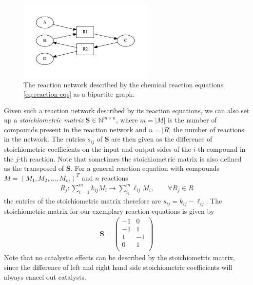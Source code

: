 \documentclass[10pt]{article}
\newcommand{\mb}[1]{\mathbf{#1}}
\begin{document}
\begin{figure}%
    \centering
    \includegraphics[width=0.6\textwidth]{reaction-network}
    \caption{The reaction network described by the chemical reaction equations \ref{eq:reaction-eqs} as a bipartite graph.}
    \label{fig:reaction-network}
\end{figure}

Given such a reaction network described by its reaction equations, 
we can also set up a \emph{stoichiometric matrix} $\mb{S} \in \mathbb{N}^{m \times n}$, 
where $m = |M|$ is the number of compounds present in the reaction network and $n = |R|$ the number of reactions in the network.
The entries $s_{ij}$ of $\mb{S}$ are then given as the difference of stoichiometric coefficients on the input and output sides 
of the $i$-th compound in the $j$-th reaction.
Note that sometimes the stoichiometric matrix is also defined as the transposed of $\mb{S}$.
For a general reaction equation with compounds $M = (M_1, M_2, \dots, M_m)^T$ and $n$ reactions
\begin{align}
    R_j: \sum_{i=1}^m k_{ij} M_i \to \sum_{i_1}^m \ell_{ij} M_i, \qquad \forall R_j \in R
\end{align}
the entries of the stoichiometric matrix therefore are $s_{ij} = k_{ij} - \ell_{ij}$.
The stoichiometric matrix for our exemplary reaction equations is given by
\begin{align}
    \mb{S} = \begin{pmatrix}
	-1 &  0 \\
	-1 &  1 \\
	1  & -1 \\
	0  &  1 \\
    \end{pmatrix}
\end{align}
Note that no catalystic effects can be described by the stoichiometric matrix, 
since the difference of left and right hand side stoichiometric coefficients will always cancel out catalysts.
\end{document}
